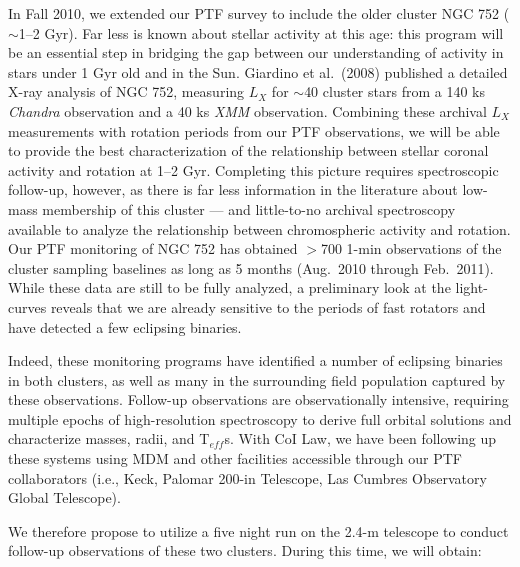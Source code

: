 In Fall 2010, we extended our PTF survey to include the older cluster NGC 752 ($\sim$1--2 Gyr). Far less is known about stellar activity at this age: this program will be an essential step in bridging the gap between our understanding of activity in stars under 1 Gyr old and in the Sun. Giardino et al.\ (2008) published a detailed X-ray analysis of NGC 752, measuring $L_X$ for $\sim$40 cluster stars from a 140 ks {\it Chandra} observation and a 40 ks {\it XMM} observation. Combining these archival $L_X$ measurements with rotation periods from our PTF observations, we will be able to provide the best characterization of the relationship between stellar coronal activity and rotation at 1--2 Gyr. Completing this picture requires spectroscopic follow-up, however, as there is far less information in the literature about low-mass membership of this cluster --- and little-to-no archival spectroscopy available to analyze the relationship between chromospheric activity and rotation.  Our PTF monitoring of NGC 752 has obtained $>$700 1-min observations of the cluster sampling baselines as long as 5 months (Aug.\ 2010 through Feb.\ 2011). While these data are still to be fully analyzed, a preliminary look at the light-curves reveals that we are already sensitive to the periods of fast rotators and have detected a few eclipsing binaries.

Indeed, these monitoring programs have identified a number of eclipsing binaries in both clusters, as well as many in the surrounding field population captured by these observations. Follow-up observations are observationally intensive, requiring multiple epochs of high-resolution spectroscopy to derive full orbital solutions and characterize masses, radii, and T$_{eff}$s. With CoI Law, we have been following up these systems using MDM and other facilities accessible through our PTF collaborators (i.e., Keck, Palomar 200-in Telescope, Las Cumbres Observatory Global Telescope).  

We therefore propose to utilize a five night run on the 2.4-m telescope to conduct follow-up observations of these two clusters. During this time, we will obtain:

